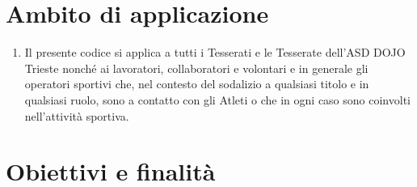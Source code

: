 \documentclass{djtsdoc}
\begin{document}
	\section{Ambito di applicazione}
	\begin{enumerate}
		\item Il presente codice si applica a tutti i Tesserati e le Tesserate dell'ASD DOJO Trieste nonché ai lavoratori, collaboratori e volontari e in generale gli operatori sportivi che, nel contesto del sodalizio a qualsiasi titolo e in qualsiasi ruolo, sono a contatto con gli Atleti o che in ogni caso sono coinvolti nell'attività sportiva.
	\end{enumerate}
	
	\section{Obiettivi e finalità}
\end{document}
